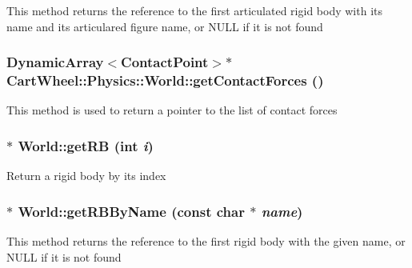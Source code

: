 This method returns the reference to the first articulated rigid body with its name and its articulared figure name, or NULL if it is not found \hypertarget{classCartWheel_1_1Physics_1_1World_ae658eb78dc8f1d3d665c61a3d07c45d3}{
\subsubsection[{getContactForces}]{\setlength{\rightskip}{0pt plus 5cm}DynamicArray$<${\bf ContactPoint}$>$$\ast$ CartWheel::Physics::World::getContactForces ()}}
\label{classCartWheel_1_1Physics_1_1World_ae658eb78dc8f1d3d665c61a3d07c45d3}
This method is used to return a pointer to the list of contact forces \hypertarget{classCartWheel_1_1Physics_1_1World_aff67bf9e59ad1d4d894ef9e96a587e3b}{
\subsubsection[{getRB}]{ $\ast$ World::getRB (int {\em i})}}
\label{classCartWheel_1_1Physics_1_1World_aff67bf9e59ad1d4d894ef9e96a587e3b}
Return a rigid body by its index \hypertarget{classCartWheel_1_1Physics_1_1World_a47eefe8fbb4f3bf33012d6831dceac65}{
\subsubsection[{getRBByName}]{ $\ast$ World::getRBByName (const char $\ast$ {\em name})}}
\label{classCartWheel_1_1Physics_1_1World_a47eefe8fbb4f3bf33012d6831dceac65}
This method returns the reference to the first rigid body with the given name, or NULL if it is not found

